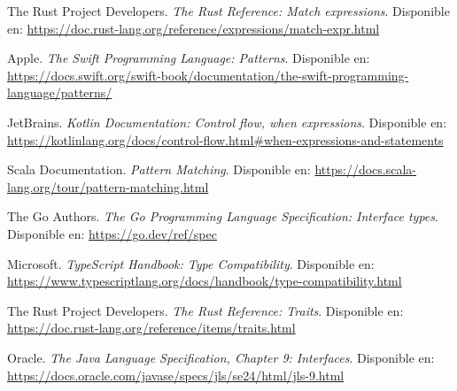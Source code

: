 \documentclass[12pt,letterpaper]{article}
\begin{document}
\begin{enumerate}[label={[\arabic*]}]
    \item The Rust Project Developers. \textit{The Rust Reference: Match expressions}. Disponible en: \url{https://doc.rust-lang.org/reference/expressions/match-expr.html}
    \item Apple. \textit{The Swift Programming Language: Patterns}. Disponible en: \url{https://docs.swift.org/swift-book/documentation/the-swift-programming-language/patterns/}
    \item JetBrains. \textit{Kotlin Documentation: Control flow, when expressions}. Disponible en: \url{https://kotlinlang.org/docs/control-flow.html#when-expressions-and-statements}
    \item Scala Documentation. \textit{Pattern Matching}. Disponible en: \url{https://docs.scala-lang.org/tour/pattern-matching.html}
    \item The Go Authors. \textit{The Go Programming Language Specification: Interface types}. Disponible en: \url{https://go.dev/ref/spec}
    \item Microsoft. \textit{TypeScript Handbook: Type Compatibility}. Disponible en: \url{https://www.typescriptlang.org/docs/handbook/type-compatibility.html}
    \item The Rust Project Developers. \textit{The Rust Reference: Traits}. Disponible en: \url{https://doc.rust-lang.org/reference/items/traits.html}
    \item Oracle. \textit{The Java Language Specification, Chapter 9: Interfaces}. Disponible en: \url{https://docs.oracle.com/javase/specs/jls/se24/html/jls-9.html}
\end{enumerate}
\end{document}
